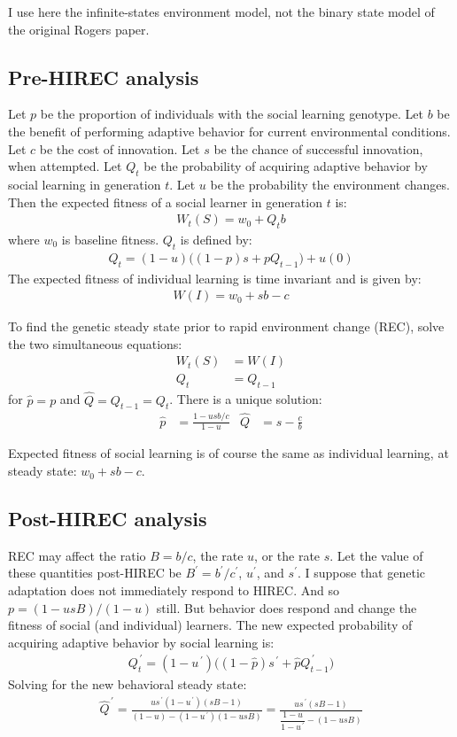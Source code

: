 \documentclass[reqno,12pt]{amsart}
\newcommand{\pp}{^{\,\prime}}
\begin{document}
I use here the infinite-states environment model, not the binary state model of the original Rogers paper.

\subsection{Pre-HIREC analysis}

Let $p$ be the proportion of individuals with the social learning genotype. Let $b$ be the benefit of performing adaptive behavior for current environmental conditions. Let $c$ be the cost of innovation. Let $s$ be the chance of successful innovation, when attempted. Let $Q_t$ be the probability of acquiring adaptive behavior by social learning in generation $t$. Let $u$ be the probability the environment changes. Then the expected fitness of a social learner in generation $t$ is:
\begin{align}
	W_t(S) = w_0 + Q_t b
\end{align}
where $w_0$ is baseline fitness. $Q_t$ is defined by:
\begin{align}
	Q_t = (1-u)\big( (1-p)s + pQ_{t-1} ) + u(0)
\end{align}
The expected fitness of individual learning is time invariant and is given by:
\begin{align*}
	W(I) = w_0 + sb - c
\end{align*}

To find the genetic steady state prior to rapid environment change (REC), solve the two simultaneous equations:
\begin{align*}
	W_t(S) &= W(I) \\
	Q_t &= Q_{t-1}
\end{align*}
for $\hat p = p$ and $\hat Q = Q_{t-1} = Q_t$. There is a unique solution:
\begin{align}
	\hat p &= \frac{1 - u s b/c}{1-u} & \hat Q &= s - \frac{c}{b}
\end{align}

Expected fitness of social learning is of course the same as individual learning, at steady state: $w_0 + s b - c$.

\subsection{Post-HIREC analysis}

REC may affect the ratio $B = b/c$, the rate $u$, or the rate $s$. Let the value of these quantities post-HIREC be $B^\prime = b^\prime / c^\prime$, $u^\prime$, and $s^\prime$. I suppose that genetic adaptation does not immediately respond to HIREC. And so $p = (1-usB)/(1-u)$ still. But behavior does respond and change the fitness of social (and individual) learners. The new expected probability of acquiring adaptive behavior by social learning is:
\begin{align}
	Q_t\pp = (1-u\pp) \big( (1-\hat p)s\pp + \hat p Q_{t-1}\pp \big)
\end{align}
Solving for the new behavioral steady state:
\begin{align}
	\hat Q\pp = \frac{u s\pp (1-u\pp)(sB-1) }{ (1-u) - (1-u\pp)(1-usB) } = \frac{u s\pp (sB-1)}{ \dfrac{1-u}{1-u\pp} -(1-usB) }
\end{align}
\end{document}
